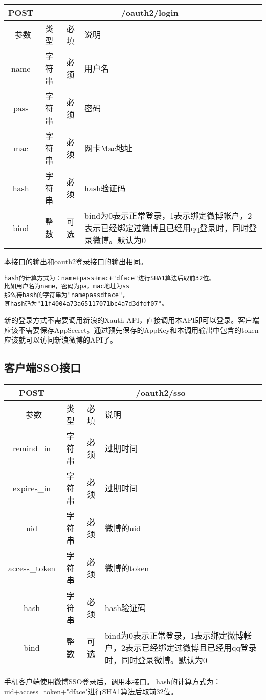 \begin{table}[H]
   \begin{center}
\begin{tabular}{|c|c|c|p{12cm}|}
\hline
POST & \multicolumn{3}{|c|}{/oauth2/login} \\
\hline\hline
 \  参数  & 类型 & 必填 &  说明  \\
\hline
 name  & 字符串 & 必须 &  用户名\\
 \hline
 pass  & 字符串 & 必须 &  密码\\
  \hline
 mac  & 字符串 & 必须 &  网卡Mac地址\\
 \hline
 hash  & 字符串 & 必须 &  hash验证码\\
\hline
 bind  & 整数 & 可选 &  bind为0表示正常登录，1表示绑定微博帐户，2表示已经绑定过微博且已经用qq登录时，同时登录微博。默认为0\\
\hline
\end{tabular}
   \end{center}
\end{table}

本接口的输出和oauth2登录接口的输出相同。

\begin{verbatim}
hash的计算方式为：name+pass+mac+"dface"进行SHA1算法后取前32位。
比如用户名为name，密码为pa，mac地址为ss
那么待hash的字符串为"namepassdface"，
其hash码为"11f4004a73a65117071bc4a7d3dfdf07"。
\end{verbatim}

新的登录方式不需要调用新浪的Xauth API，直接调用本API即可以登录。客户端应该不需要保存AppSecret。通过预先保存的AppKey和本调用输出中包含的token应该就可以访问新浪微博的API了。




\subsection{客户端SSO接口}
\label{hash_algorithm}

\begin{table}[H]
   \begin{center}
\begin{tabular}{|c|c|c|p{12cm}|}
\hline
POST & \multicolumn{3}{|c|}{/oauth2/sso} \\
\hline\hline
 \  参数  & 类型 & 必填 &  说明  \\
\hline
 remind\_in  & 字符串 & 必须 &  过期时间\\
 \hline
 expires\_in  & 字符串 & 必须 &  过期时间\\
  \hline
 uid  & 字符串 & 必须 &  微博的uid\\
  \hline
 access\_token  & 字符串 & 必须 &  微博的token\\
 \hline
 hash  & 字符串 & 必须 &  hash验证码\\
\hline
 bind  & 整数 & 可选 &  bind为0表示正常登录，1表示绑定微博帐户，2表示已经绑定过微博且已经用qq登录时，同时登录微博。默认为0\\
\hline
\end{tabular}
   \end{center}
\end{table}
手机客户端使用微博SSO登录后，调用本接口。
hash的计算方式为：uid+access\_token+"dface"进行SHA1算法后取前32位。


